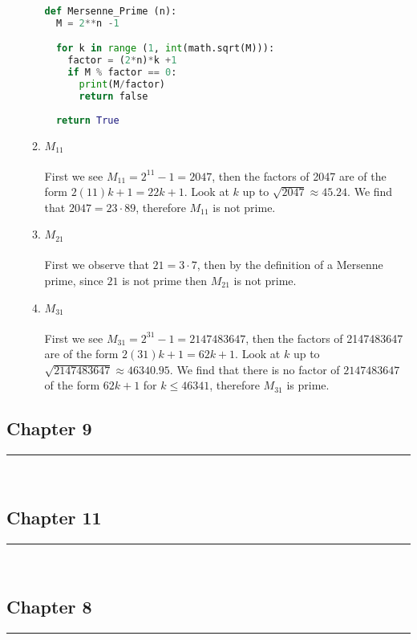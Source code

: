 \documentclass[class=article, crop=false]{standalone}
\begin{document}
\begin{enumerate}
\begin{enumerate}
\begin{center}
\begin{lstlisting}[language=Python]
def Mersenne_Prime (n):
  M = 2**n -1

  for k in range (1, int(math.sqrt(M))):
	factor = (2*n)*k +1
	if M % factor == 0:
	  print(M/factor)
	  return false
  
  return True
\end{lstlisting}
\end{center}


  \item
	$M_{11}$ \\\\
	First we see $M_{11} = 2^{11} - 1= 2047$, then the factors of 2047 are of the form
	$2(11)k+1 = 22k + 1$. Look at $k$ up to $\sqrt{2047}\approx 45.24$. We find that
	$2047 = 23\cdot 89$, therefore $M_{11}$ is not prime.
  \item
	$M_{21}$ \\\\
	First we observe that $21=3\cdot 7$, then by the definition of a Mersenne prime, since $21$ is
	not prime then $M_{21}$ is not prime.
  \item
	$M_{31}$ \\\\
	First we see $M_{31} = 2^{31} -1=2147483647$, then the factors of 2147483647 are of the form
	$2(31)k+1 = 62k+1$. Look at $k$ up to $\sqrt{2147483647} \approx 46340.95$. We find that
	there is no factor of $2147483647$ of the form $62k+1$ for $k\leq 46341$, therefore $M_{31}$ is prime.
  \end{enumerate}

\end{enumerate}

\setcounter{subsection}{8}
\subsection{Chapter 9}
\rule{\textwidth}{1pt}\\

\setcounter{subsection}{10}
\subsection{Chapter 11}
\rule{\textwidth}{1pt}\\

\setcounter{subsection}{7}
\subsection{Chapter 8}
\rule{\textwidth}{1pt}\\
\end{document}
